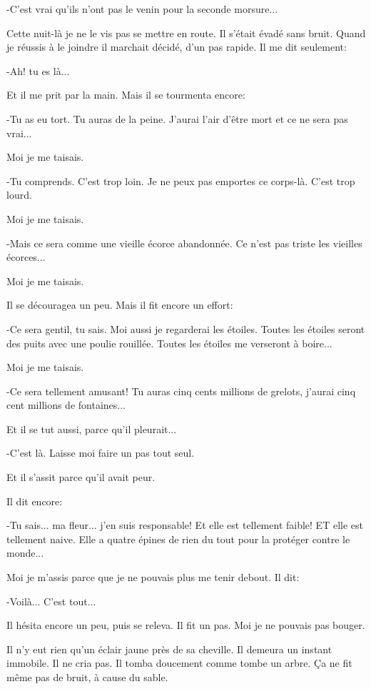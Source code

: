 \documentclass{report}
\begin{document}
-C'est vrai qu'ils n'ont pas le venin pour la seconde morsure...

Cette nuit-là je ne le vis pas se mettre en route. Il s'était évadé sans bruit. Quand je réussis à le joindre il marchait décidé, d'un pas rapide. Il me dit seulement:

-Ah! tu es là...

Et il me prit par la main. Mais il se tourmenta encore:

-Tu as eu tort. Tu auras de la peine. J'aurai l'air d'être mort et ce ne sera pas vrai...

Moi je me taisais.

-Tu comprends. C'est trop loin. Je ne peux pas emportes ce corps-là. C'est trop lourd.

Moi je me taisais.

-Mais ce sera comme une vieille écorce abandonnée. Ce n'est pas triste les vieilles écorces...

Moi je me taisais.

Il se découragea un peu. Mais il fit encore un effort:

-Ce sera gentil, tu sais. Moi aussi je regarderai les étoiles. Toutes les étoiles seront des puits avec une poulie rouillée. Toutes les étoiles me verseront à boire...

Moi je me taisais.

-Ce sera tellement amusant! Tu auras cinq cents millions de grelots, j'aurai cinq cent millions de fontaines...

Et il se tut aussi, parce qu'il pleurait...

-C'est là. Laisse moi faire un pas tout seul.

Et il s'assit parce qu'il avait peur. 


Il dit encore:

-Tu sais... ma fleur... j'en suis responsable! Et elle est tellement faible! ET elle est tellement naive. Elle a quatre épines de rien du tout pour la protéger contre le monde... 


Moi je m'assis parce que je ne pouvais plus me tenir debout. Il dit:

-Voilà... C'est tout...

Il hésita encore un peu, puis se releva. Il fit un pas. Moi je ne pouvais pas bouger.

Il n'y eut rien qu'un éclair jaune près de sa cheville. Il demeura un instant immobile. Il ne cria pas. Il tomba doucement comme tombe un arbre. Ça ne fit même pas de bruit, à cause du sable. 
\end{document}
